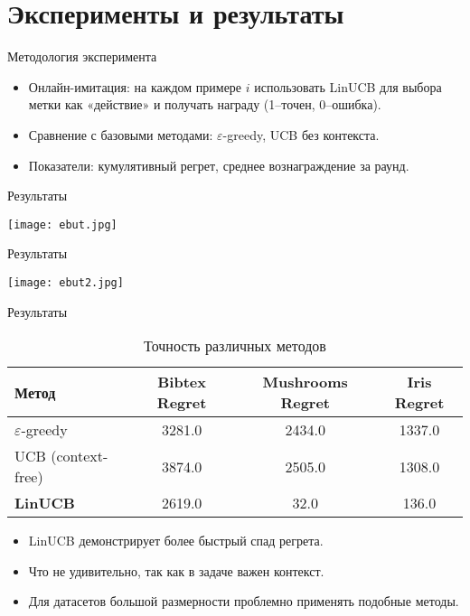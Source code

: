 \documentclass[10pt]{beamer}
\begin{document}
\section{Эксперименты и результаты}
\begin{frame}{Методология эксперимента}
  \begin{itemize}
    \item Онлайн-имитация: на каждом примере $i$ использовать LinUCB для выбора метки как «действие» и получать награду (1–точен, 0–ошибка).
    \item Сравнение с базовыми методами: $\varepsilon$-greedy, UCB без контекста.
    \item Показатели: кумулятивный регрет, среднее вознаграждение за раунд.
  \end{itemize}
\end{frame}
\begin{frame}{Результаты}
  \begin{center}
    \texttt{[image: ebut.jpg]}
  \end{center}
\end{frame}
\begin{frame}{Результаты}
  \begin{center}
    \texttt{[image: ebut2.jpg]}
  \end{center}
\end{frame}
\begin{frame}{Результаты}
  \begin{table}[ht]
    \centering
    \begin{tabular}{lccc}
      \hline
      \textbf{Метод} & \textbf{Bibtex Regret} & \textbf{Mushrooms Regret} & \textbf{Iris Regret} \\
      \hline
      $\varepsilon$-greedy &  3281.0 &  2434.0 & 1337.0 \\
      UCB (context-free) & 3874.0 & 2505.0 & 1308.0 \\
      \textbf{LinUCB } &2619.0& 32.0 & 136.0 \\
      \hline
    \end{tabular}
    \caption{Точность различных методов}
  \end{table}
  \vspace{1em}
  \begin{itemize}
    \item LinUCB демонстрирует более быстрый спад регрета.
    \item Что не удивительно, так как в задаче важен контекст.
    \item Для датасетов большой размерности проблемно применять подобные методы.
  \end{itemize}
\end{frame}
\end{document}
